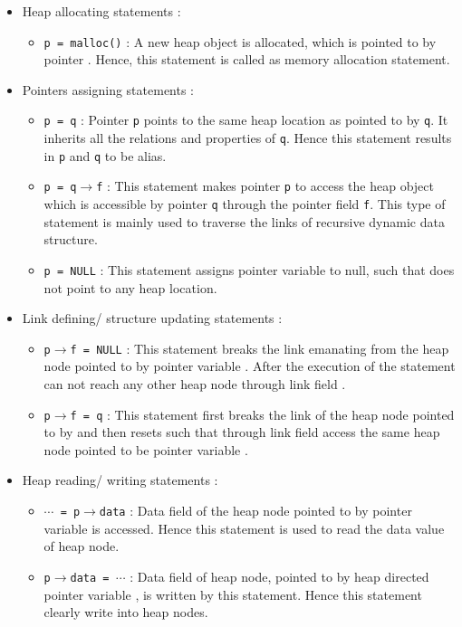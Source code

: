 \begin{itemize}
\item Heap allocating statements :

\begin{itemize}
\item {\tt p = malloc()} : A new heap object is allocated, which is pointed to by pointer . 
Hence, this statement is called as memory allocation statement. 
\end{itemize}

\item Pointers assigning statements :

\begin{itemize}
\item {\tt p = q} : Pointer {\tt p} points to the same heap location as pointed 
to by {\tt q}. It inherits all the relations and properties of {\tt q}. Hence 
this statement results in {\tt p} and {\tt q} to be alias.
\item {\tt p = q$\rightarrow$f} : This statement makes pointer {\tt p} to access 
the heap object which is accessible by pointer {\tt q} through the pointer field 
{\tt f}. This type of statement is mainly used to traverse the links of recursive 
dynamic data structure. 
\item {\tt p = NULL} : This statement assigns pointer variable  to null, such that  
does not point to any heap location. 
\end{itemize}

\item Link defining/ structure updating statements :

\begin{itemize}
\item {\tt p$\rightarrow$f = NULL} : This statement breaks the link  emanating from the heap node pointed 
to by pointer variable . After the execution of the statement  can not reach any other heap node 
through link field .
\item {\tt p$\rightarrow$f = q} : This statement first breaks the link  of the heap node 
pointed to by  and then resets  such that  through link field  
access the same heap node pointed to be pointer variable . 
\end{itemize}

\item Heap reading/ writing statements : 

\begin{itemize}
\item {\tt $\cdots$ = p$\rightarrow$data} : Data field of the heap node pointed to 
by pointer variable  is accessed. Hence this statement is used to read the 
data value of heap node. 
\item {\tt p$\rightarrow$data = $\cdots$} : Data field of heap node, pointed to 
by heap directed pointer variable , is written by this statement. Hence 
this statement clearly write into heap nodes.
\end{itemize}

\end{itemize}

